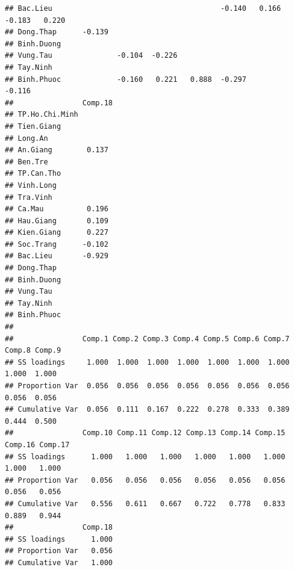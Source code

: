 \documentclass[../thesis.tex]{subfiles}
\begin{document}
\begin{verbatim}
## Bac.Lieu                                       -0.140   0.166  -0.183   0.220 
## Dong.Thap      -0.139                                                         
## Binh.Duong                                                                    
## Vung.Tau               -0.104  -0.226                                         
## Tay.Ninh                                                                      
## Binh.Phuoc             -0.160   0.221   0.888  -0.297                  -0.116 
##                Comp.18
## TP.Ho.Chi.Minh        
## Tien.Giang            
## Long.An               
## An.Giang        0.137 
## Ben.Tre               
## TP.Can.Tho            
## Vinh.Long             
## Tra.Vinh              
## Ca.Mau          0.196 
## Hau.Giang       0.109 
## Kien.Giang      0.227 
## Soc.Trang      -0.102 
## Bac.Lieu       -0.929 
## Dong.Thap             
## Binh.Duong            
## Vung.Tau              
## Tay.Ninh              
## Binh.Phuoc            
## 
##                Comp.1 Comp.2 Comp.3 Comp.4 Comp.5 Comp.6 Comp.7 Comp.8 Comp.9
## SS loadings     1.000  1.000  1.000  1.000  1.000  1.000  1.000  1.000  1.000
## Proportion Var  0.056  0.056  0.056  0.056  0.056  0.056  0.056  0.056  0.056
## Cumulative Var  0.056  0.111  0.167  0.222  0.278  0.333  0.389  0.444  0.500
##                Comp.10 Comp.11 Comp.12 Comp.13 Comp.14 Comp.15 Comp.16 Comp.17
## SS loadings      1.000   1.000   1.000   1.000   1.000   1.000   1.000   1.000
## Proportion Var   0.056   0.056   0.056   0.056   0.056   0.056   0.056   0.056
## Cumulative Var   0.556   0.611   0.667   0.722   0.778   0.833   0.889   0.944
##                Comp.18
## SS loadings      1.000
## Proportion Var   0.056
## Cumulative Var   1.000
\end{verbatim}
\end{document}
